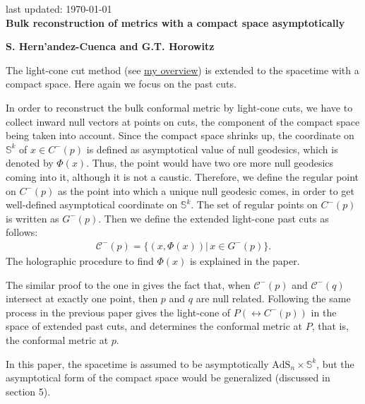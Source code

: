 \documentclass[12pt]{article}
\date{}
\begin{document}
{\Large{}
\hfill{\normalsize last updated: \today}
\\[2mm]
\textbf{Bulk reconstruction of metrics with a compact space asymptotically \cite{Hernandez-Cuenca:2020ppu}
}
}

\noindent
\hfill
\textbf{S. Hern'andez-Cuenca and G.T. Horowitz}%

\vspace{12pt}
The light-cone cut method \cite{Engelhardt:2016wgb} 
(see \href{https://albertmcc.github.io/web/reviews/light-cone1.pdf}{\color{blue}my overview}) 
is extended to the spacetime with a compact space.
Here again we focus on the past cuts.

In order to reconstruct the bulk conformal metric by light-cone cuts, we have to collect inward null vectors at points on cuts,
the component of the compact space being taken into account.
Since the compact space shrinks up, the coordinate on $\mathbb S^k$ of $x \in C^-(p)$ 
is defined as asymptotical value of null geodesics, which is denoted by $\Phi(x)$.
Thus, the point would have two ore more null geodesics coming into it,
although it is not a caustic.
Therefore, we define the regular point on $C^-(p)$ as the point into which a unique null geodesic comes, 
in order to get well-defined asymptotical coordinate on $\mathbb S^k$.
The set of regular points on $C^-(p)$ is written as $G^-(p)$.
Then we define the extended light-cone past cuts as follows:
\begin{align}
	\mathcal C^-(p) = \{(x,\Phi(x))|\,x\in G^-(p)\}.
\end{align}
The holographic procedure to find $\Phi(x)$ is explained in the paper.

The similar proof to the one in \cite{Engelhardt:2016wgb} gives the fact that, 
when $\mathcal C^-(p)$ and $\mathcal C^-(q)$ intersect at exactly one point, then $p$ and $q$ are null related.
Following the same process in the previous paper gives the light-cone of $P (\leftrightarrow C^-(p))$ 
in the space of extended past cuts, and determines the conformal metric at $P$, that is, the conformal metric at $p$.

In this paper, the spacetime is assumed to be asymptotically $\mathrm{AdS}_n\times\mathbb S^k$,
but  the asymptotical form of the compact space would be generalized (discussed in section 5).



 

\end{document}
